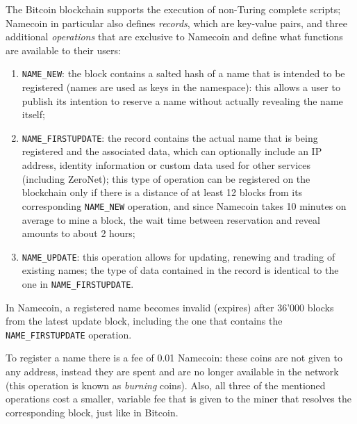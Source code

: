 \documentclass[mscthesis]{usiinfthesis}
\begin{document}

The Bitcoin blockchain supports the execution of non-Turing complete scripts; Namecoin in particular also defines \emph{records}, which are key-value pairs, and three additional \emph{operations} that are exclusive to Namecoin and define what functions are available to their users:
\begin{enumerate}
	\item \texttt{NAME\_NEW}: the block contains a salted hash of a name that is intended to be registered (names are used as keys in the namespace): this allows a user to publish its intention to reserve a name without actually revealing the name itself;
	\item \texttt{NAME\_FIRSTUPDATE}: the record contains the actual name that is being registered and the associated data, which can optionally include an IP address, identity information or custom data used for other services (including ZeroNet); this type of operation can be registered on the blockchain only if there is a distance of at least 12 blocks from its corresponding \texttt{NAME\_NEW} operation, and since Namecoin takes 10 minutes on average to mine a block, the wait time between reservation and reveal amounts to about 2 hours;
	\item \texttt{NAME\_UPDATE}: this operation allows for updating, renewing and trading of existing names; the type of data contained in the record is identical to the one in \texttt{NAME\_FIRSTUPDATE}.
\end{enumerate}

In Namecoin, a registered name becomes invalid (expires) after 36'000 blocks from the latest update block, including the one that contains the \texttt{NAME\_FIRSTUPDATE} operation.

To register a name there is a fee of 0.01 Namecoin: these coins are not given to any address, instead they are spent and are no longer available in the network (this operation is known as \emph{burning} coins). Also, all three of the mentioned operations cost a smaller, variable fee that is given to the miner that resolves the corresponding block, just like in Bitcoin.
\end{document}

